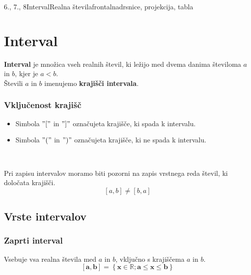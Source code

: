 \begin{priprava}{6., 7., 8}{}{Interval}{Realna števila}{frontalna}{drsnice, projekcija, tabla}
    
    \section{Interval}

        

            
                \textbf{Interval} je množica vseh realnih števil, ki ležijo med dvema danima številoma $a$ in $b$, kjer je $a<b$. \\
                Števili $a$ in $b$ imenujemo \textbf{krajišči intervala}.                
            
            

            \subsubsection*{Vključenost krajišč}
                \begin{itemize}
                    \item Simbola $"["$ in $"]"$ označujeta krajišče, ki spada k intervalu.
                    \item Simbola $"("$ in $")"$ označujeta krajišče, ki ne spada k intervalu.
                \end{itemize}
            
            
                ~
            
                Pri zapisu intervalov moramo biti pozorni na zapis vrstnega reda števil, ki določata krajišči.
                $$[a,b]\neq[b,a]$$
            
            


        

        
            \subsection{Vrste intervalov}

            \subsubsection*{Zaprti interval}
            Vsebuje vsa realna števila med $a$ in $b$, vključno s krajiščema $a$ in $b$.
            $$ \mathbf{[a,b]=\left\{x\in\mathbb{R}; a\leq x\leq b\right\} }$$


\end{priprava}

